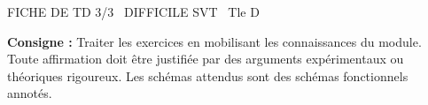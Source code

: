 \documentclass[11pt]{article}
\begin{document}
\begin{tcolorbox}[enhanced,colback=popink,colframe=popink,arc=10pt,boxrule=0pt,left=12pt,right=12pt,top=9pt,bottom=9pt]
{\color{white}\popxbold\small FICHE DE TD 3/3 \textbullet\ DIFFICILE \hfill SVT \textbullet\ Tle D\par}
\end{tcolorbox}
\vspace{4pt}
\noindent \textbf{Consigne :} Traiter les exercices en mobilisant les connaissances du module. Toute affirmation doit être justifiée par des arguments expérimentaux ou théoriques rigoureux. Les schémas attendus sont des schémas fonctionnels annotés.
\end{document}
